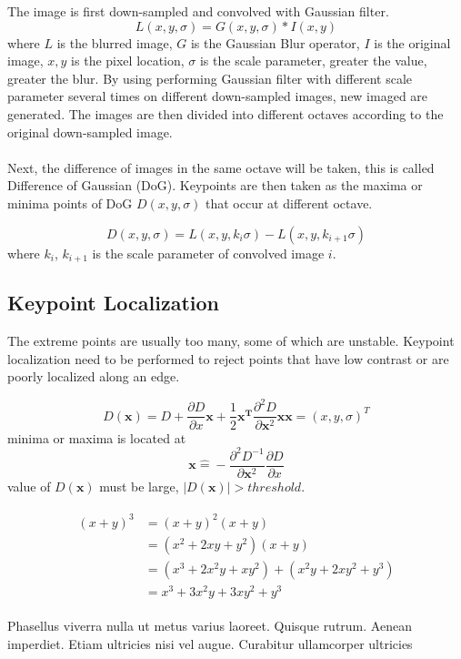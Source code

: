 \documentclass[paper=a4, fontsize=11pt]{scrartcl} %
\numberwithin{equation}{section} %
\numberwithin{figure}{section} %
\numberwithin{table}{section} %
\begin{document}
The image is first down-sampled and convolved with Gaussian filter.
$$
L(x, y, \sigma) = G(x, y, \sigma) * I(x, y)
$$
where 
$L$ is the blurred image, 
$G$ is the Gaussian Blur operator, 
$I$ is the original image, 
$x, y$ is the pixel location, 
$\sigma$ is the scale parameter, greater the value, greater the blur.
By using performing Gaussian filter with different scale parameter several times on different down-sampled images, new imaged are generated.
The images are then divided into different octaves according to the original down-sampled image.

\paragraph{}
Next, the difference of images in the same octave will be taken, this is called Difference of Gaussian (DoG). 
Keypoints are then taken as the maxima or minima points of DoG $D(x, y, \sigma)$ that occur at different octave.

$$
D(x, y, \sigma) = L(x, y, k_i\sigma) - L(x, y, k_{i+1}\sigma)
$$
where $k_i$, $k_{i+1}$ is the scale parameter of convolved image $i$.

\subsection{Keypoint Localization}
The extreme points are usually too many, some of which are unstable.
Keypoint localization need to be performed to reject points that have low contrast or are poorly localized along an edge.

$$
D(\mathbf{x}) = D + \frac{\partial D }{\partial x}\mathbf{x} + \frac{1}{2}\mathbf{x^T}\frac{\partial ^ 2 D}{\partial \mathbf{x}^2}\mathbf{x}
\mathbf{x} = (x, y, \sigma)^T
$$
minima or maxima is located at 
$$
\mathbf{x}\hat = -\frac{\partial ^ 2 D^{-1}}{\partial \mathbf{x}^2}\frac{\partial D }{\partial x}
$$
value of $D(\mathbf{x})$ must be large, $|D(\mathbf{x})| > threshold$.

\begin{align} 
\begin{split}
(x+y)^3 	&= (x+y)^2(x+y)\\
&=(x^2+2xy+y^2)(x+y)\\
&=(x^3+2x^2y+xy^2) + (x^2y+2xy^2+y^3)\\
&=x^3+3x^2y+3xy^2+y^3
\end{split}					
\end{align}

Phasellus viverra nulla ut metus varius laoreet. Quisque rutrum. Aenean imperdiet. Etiam ultricies nisi vel augue. Curabitur ullamcorper ultricies
\end{document}
